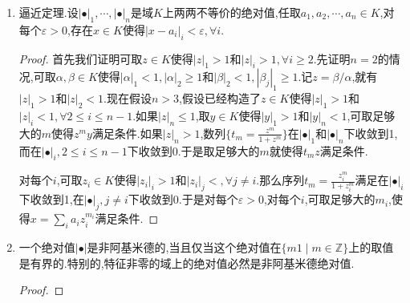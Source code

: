 \begin{enumerate}
    和非阿基米德绝对值等价的绝对值只能是非阿基米德绝对值,和阿基米德绝对值等价的绝对值只能是阿基米德绝对值.于是阿基米德性不止是对绝对值来讲的,还是对绝对值等价类来讲的.如果一个绝对值的等价类由阿基米德绝对值构成,就称它是一个无穷素位;如果等价类由非阿基米德绝对值构成,就称它是一个有限素位.另外注意对阿基米德绝对值$|\bullet|$,对$a>0$,未必有$|\bullet|^a$仍然是绝对值,但是如果$|\bullet|$是非阿基米德绝对值,那么对任意$a>0$都有$|\bullet|^a$是非阿基米德绝对值.
	\begin{proof}
		
		1推2,按照$|a^n|=|a|^n$,于是$a^n\to0$当且仅当$|a|<1$,于是按照$|\bullet|_1$和$|\bullet|_2$诱导相同的拓扑,同一个点列的敛散性是相同的,于是$|a|_1<1\Leftrightarrow|a|_2<1$.2推3,假如$|\bullet|_1$是平凡绝对值,那么条件说明不存在非0元在$|\bullet|_2$下是小于1或者大于1的,于是$|\bullet|_2$也是平凡绝对值.现在设$|\bullet|_1$不是非平凡的,于是可取$y\in K$使得$|y|_1>1$.任取非0的$x\in K$,那么存在一个实数$b$使得$|x|_1=|y|_1^b$,取有理数列$m_i/n_i>b$并且趋于$b$.得到$|x|_1=|y|_1^b<|y|_1^{m_i/n_i}$,导致$|\frac{x^{n_i}}{y^{m_i}}|_1<1$,于是$|\frac{x^{n_i}}{y^{m_i}}|_2<1$,于是$|x|_2<|y|_2^{m_i/n_i}$,让$i$趋于无穷,得到$|x|_2\le|y|_2^b$,再取小于$b$的趋于$b$的有理数列,得到$|x|_2\ge|y|_2^b$,于是$|x|_2=|y|_2^b$对任意的非0元$x$成立.于是设$|y|_1=|y|_2^a$,就有对任意非0元$x$有$|x|_1=|y|_1^b=|y|_2^{ab}=|x|_2^a$.最后3推1是直接的.
	\end{proof}
    \item 逼近定理.设$|\bullet|_1,\cdots,|\bullet|_n$是域$K$上两两不等价的绝对值,任取$a_1,a_2,\cdots,a_n\in K$,对每个$\varepsilon>0$,存在$x\in K$使得$|x-a_i|_i<\varepsilon,\forall i$.
    \begin{proof}
    	
    	首先我们证明可取$z\in K$使得$|z|_1>1$和$|z|_i>1,\forall i\ge2$.先证明$n=2$的情况,可取$\alpha,\beta\in K$使得$|\alpha|_1<1,|\alpha|_2\ge1$和$|\beta|_2<1,|\beta_j|_1\ge1$.记$z=\beta/\alpha$,就有$|z|_1>1$和$|z|_2<1$.现在假设$n>3$,假设已经构造了$z\in K$使得$|z|_1>1$和$|z|_i<1,\forall 2\le i\le n-1$.如果$|z|_n\le1$,取$y\in K$使得$|y|_1>1$和$|y|_n<1$,可取足够大的$m$使得$z^my$满足条件.如果$|z|_n>1$,数列$\{t_m=\frac{z^m}{1+z^m}\}$在$|\bullet|_1$和$|\bullet|_n$下收敛到1,而在$|\bullet|_i,2\le i\le n-1$下收敛到0.于是取足够大的$m$就使得$t_mz$满足条件.
    	
    	对每个$i$,可取$z_i\in K$使得$|z_i|_i>1$和$|z_i|_j<,\forall j\not=i$.那么序列$t_m=\frac{z_i^m}{1+z_i^m}$满足在$|\bullet|_i$下收敛到1,在$|\bullet|_j,j\not=i$下收敛到0.于是对每个$\varepsilon>0$,对每个$i$,可取足够大的$m_i$,使得$x=\sum_ia_iz_i^{m_i}$满足条件.
    \end{proof}
	\item 一个绝对值$|\bullet|$是非阿基米德的,当且仅当这个绝对值在$\{m1\mid m\in\mathbb{Z}\}$上的取值是有界的.特别的,特征非零的域上的绝对值必然是非阿基米德绝对值.
	\begin{proof}
		

\end{proof}
\end{enumerate}

